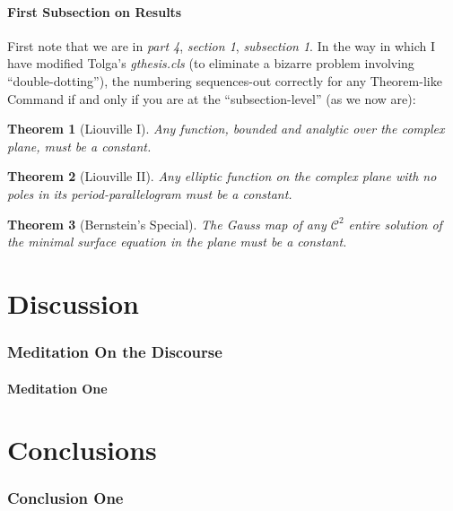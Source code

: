 \documentclass[11pt]{gthesis2}  %
\newtheorem{theorem}{Theorem}[subsection]
\begin{document}
\subsection{First Subsection on Results}
 \label{sub:firstr}
First note that we are in \emph{part 4}, \emph{section 1},
\emph{subsection 1}. In the way in which I have modified Tolga's
\emph{gthesis.cls} (to eliminate a bizarre problem involving
``double-dotting''), the numbering sequences-out correctly for any
Theorem-like Command if and only if you are at the
``subsection-level'' (as we now are):
\\
%
%
\begin{theorem}[Liouville I] Any function, bounded and analytic over the
complex plane, must be a constant.
\end{theorem}
%
\begin{theorem}[Liouville II] Any elliptic function on the complex
plane with no poles in its period-parallelogram must be a
constant.
\end{theorem}
%
\begin{theorem}[Bernstein's Special] The Gauss map of any
$\mathcal{C}^{2}$ entire solution of the minimal surface equation
in the plane must be a constant.
\end{theorem}
%
%
%
%
\newpage
%
\part{Discussion}
\label{part:disc}
%
\section{Meditation On the Discourse}
\label{sec:medondisc}
%
%
\subsection{Meditation One}
\label{sub:medI}
%
%
\newpage
%
\part{Conclusions}
\label{part:cands}
%
\section{Conclusion One}
\label{sec:con1}
%
%
\end{document}
